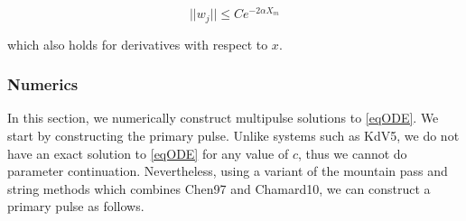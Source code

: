 \documentclass[12pt]{article}
\begin{document}
\begin{equation}\label{sjwbound}
||w_j|| \leq C e^{-2 \alpha X_m}
\end{equation}

which also holds for derivatives with respect to $x$.

\subsubsection{Numerics}

In this section, we numerically construct multipulse solutions to \eqref{eqODE}. We start by constructing the primary pulse. Unlike systems such as KdV5, we do not have an exact solution to \eqref{eqODE} for any value of $c$, thus we cannot do parameter continuation. Nevertheless, using a variant of the mountain pass and string methods which combines Chen97 and Chamard10, we can construct a primary pulse as follows.
\end{document}
